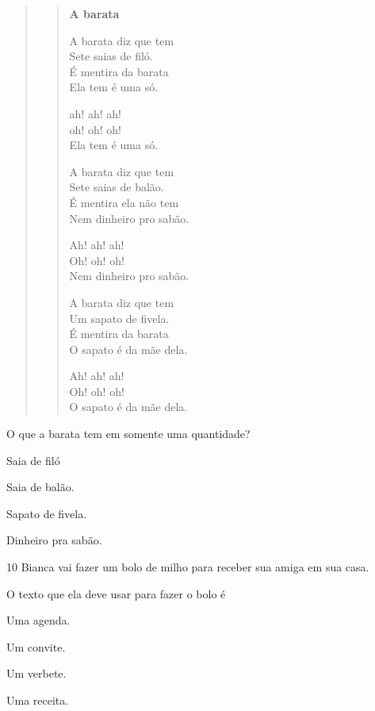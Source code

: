 \begin{quote}
\begin{verse}
\textbf{A barata}

A barata diz que tem\\
Sete saias de filó.\\
É mentira da barata\\
Ela tem é uma só.

ah! ah! ah!\\
oh! oh! oh!\\
Ela tem é uma só.

A barata diz 
que tem\\
Sete saias de balão.\\
É mentira ela não tem\\
Nem dinheiro pro sabão.

Ah! ah! ah!\\
Oh! oh! oh!\\
Nem dinheiro pro sabão.

A barata diz que tem\\
Um sapato de fivela.\\
É mentira da barata\\
O sapato é da mãe dela.

Ah! ah! ah!\\
Oh! oh! oh!\\
O sapato é da mãe dela.
\end{verse}

\end{quote}

\pagebreak
O que a barata tem em somente uma quantidade?

\begin{escolha}
\item Saia de filó

\item Saia de balão.

\item Sapato de fivela.

\item Dinheiro pra sabão.
\end{escolha}

\num{10} Bianca vai fazer um bolo de milho para receber sua amiga em sua casa.

O texto que ela deve usar para fazer o bolo é

\begin{multicols}{2}
\begin{escolha}
\item Uma agenda.

\item Um convite.

\item Um verbete.

\item Uma receita.
\end{escolha}
\end{multicols}

